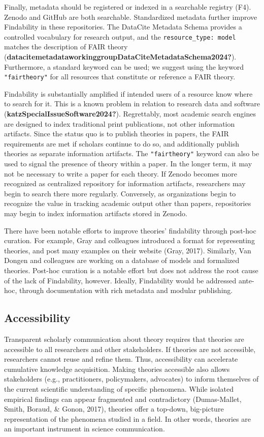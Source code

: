 \documentclass[
  man,floatsintext]{apa6}
\begin{document}
Finally, metadata should be registered or indexed in a searchable registry (F4).
Zenodo and GitHub are both searchable.
Standardized metadata further improve Findability in these repositories.
The DataCite Metadata Schema provides a controlled vocabulary for research output, and the \texttt{resource\_type:\ model} matches the description of FAIR theory (\textbf{datacitemetadataworkinggroupDataCiteMetadataSchema2024?}).
Furthermore, a standard keyword can be used; we suggest using the keyword \texttt{"fairtheory"} for all resources that constitute or reference a FAIR theory.

Findability is substantially amplified if intended users of a resource know where to search for it.
This is a known problem in relation to research data and software (\textbf{katzSpecialIssueSoftware2024?}).
Regrettably, most academic search engines are designed to index traditional print publications, not other information artifacts.
Since the status quo is to publish theories in papers,
the FAIR requirements are met if scholars continue to do so,
and additionally publish theories as separate information artifacts.
The \texttt{"fairtheory"} keyword can also be used to signal the presence of theory within a paper.
In the longer term, it may not be necessary to write a paper for each theory.
If Zenodo becomes more recognized as centralized repository for information artifacts, researchers may begin to search there more regularly.
Conversely, as organizations begin to recognize the value in tracking academic output other than papers, repositories may begin to index information artifacts stored in Zenodo.

There have been notable efforts to improve theories' findability through post-hoc curation.
For example, Gray and colleagues introduced a format for representing theories,
and post many examples on their website (Gray, 2017).
Similarly, Van Dongen and colleagues are working on a database of models and formalized theories.
Post-hoc curation is a notable effort but does not address the root cause of the lack of Findability, however.
Ideally, Findability would be addressed ante-hoc, through documentation with rich metadata and modular publishing.

\subsection{Accessibility}\label{accessibility}

Transparent scholarly communication about theory requires that theories are accessible to all researchers and other stakeholders.
If theories are not accessible, researchers cannot reuse and refine them.
Thus, accessibility can accelerate cumulative knowledge acquisition.
Making theories accessible also allows stakeholders (e.g., practitioners, policymakers, advocates) to inform themselves of the current scientific understanding of specific phenomena.
While isolated empirical findings can appear fragmented and contradictory (Dumas-Mallet, Smith, Boraud, \& Gonon, 2017),
theories offer a top-down, big-picture representation of the phenomena studied in a field.
In other words, theories are an important instrument in science communication.
\end{document}
